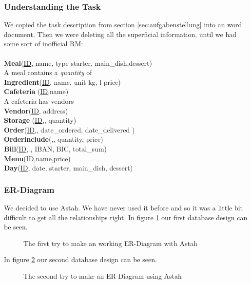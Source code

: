 \documentclass[12pt]{article}
\begin{document}
\subsubsection{Understanding the Task}
We copied the task description from section \ref{sec:aufgabenstellung} into an word document. 
Then we were deleting all the superficial information, until we had some sort of inofficial RM: \\
\\
\textbf{Meal}(\underline{ID}, name, type {starter, main\_dish,dessert}) \\
A meal contains a \textit{quantity} of \\
\textbf{Ingredient}(\underline{ID}, name, unit {kg, l} price) \\
\textbf{Cafeteria}  (\underline{ID},name) \\
A cafeteria has vendors  \\
\textbf{Vendor}(\underline{ID}, address) \\
\textbf{Storage} (\underline{ID},, quantity) \\
\textbf{Order}(\underline{ID},, date\_ordered, date\_delivered ) \\
\textbf{Orderinclude}(,, quantity, price) \\
\textbf{Bill}(\underline{ID}, , IBAN, BIC, total\_sum) \\
\textbf{Menu}(\underline{ID},name,price) \\
\textbf{Day}(\underline{ID}, date, starter, main\_dish, dessert) \\
\subsubsection{ER-Diagram}
We decided to use Astah. We have never used it before and so it was a little bit difficult to get all the relationships right.
In figure \ref{fig:try1} our first database design can be seen.
 \begin{figure}[here!]
	\centering
	\caption{The first try to make an working ER-Diagram with Astah}
	\label{fig:try1}
	\end{figure}
	
In figure \ref{fig:try2} our second database design can be seen. 
 \begin{figure}[here!]
	\centering
	\caption{The second try to make an ER-Diagram using Astah}
	\label{fig:try2}
	\end{figure}	
\end{document}
